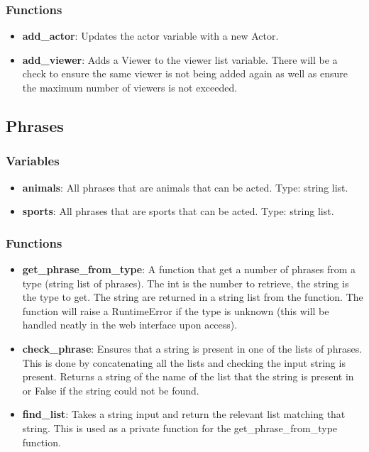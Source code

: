 \documentclass{article}
\begin{document}
\subsubsection{Functions}
\begin{itemize}

	\item \textbf{add\_actor}: Updates the actor variable with a new Actor.
	
	\item \textbf{add\_viewer}: Adds a Viewer to the viewer list variable. There will be a check to ensure the same viewer is not being added again as well as ensure the maximum number of viewers is not exceeded.
	
\end{itemize}

\subsection{Phrases}
\subsubsection{Variables}
\begin{itemize}

	\item \textbf{animals}: All phrases that are animals that can be acted. Type: string list.
	
	\item \textbf{sports}: All phrases that are sports that can be acted. Type: string list.
	
\end{itemize}

\subsubsection{Functions}
\begin{itemize}
	
	\item \textbf{get\_phrase\_from\_type}: A function that get a number of phrases from a type (string list of phrases). The int is the number to retrieve, the string is the type to get. The string are returned in a string list from the function. The function will raise a RuntimeError if the type is unknown (this will be handled neatly in the web interface upon access).
	
	\item \textbf{check\_phrase}: Ensures that a string is present in one of the lists of phrases. This is done by concatenating all the lists and checking the input string is present. Returns a string of the name of the list that the string is present in or False if the string could not be found.
	
	\item \textbf{find\_list}: Takes a string input and return the relevant list matching that string. This is used as a private function for the get\_phrase\_from\_type function.
	
\end{itemize}
\end{document}
